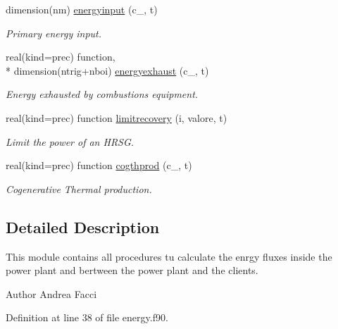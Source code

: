 \begin{DoxyCompactItemize}
dimension(nm) \hyperlink{classenergy_aebd116fdbb931db63a6450c7ba3197df}{energyinput} (c\-\_\-, t)
\begin{DoxyCompactList}\small\item\em Primary energy input. \end{DoxyCompactList}\item 
real(kind=prec) function, \\*
dimension(ntrig+nboi) \hyperlink{classenergy_aa9595768898cb233d53596e9ce19744f}{energyexhaust} (c\-\_\-, t)
\begin{DoxyCompactList}\small\item\em Energy exhausted by combustions equipment. \end{DoxyCompactList}\item 
real(kind=prec) function \hyperlink{classenergy_adee2b0ef7e3ae6a8da4a2357ffa14a28}{limitrecovery} (i, valore, t)
\begin{DoxyCompactList}\small\item\em Limit the power of an H\-R\-S\-G. \end{DoxyCompactList}\item 
real(kind=prec) function \hyperlink{classenergy_a6060381a3418f406c8ca108f9c5a7fd5}{cogthprod} (c\-\_\-, t)
\begin{DoxyCompactList}\small\item\em Cogenerative Thermal production. \end{DoxyCompactList}\end{DoxyCompactItemize}


\subsection{Detailed Description}
This module contains all procedures tu calculate the enrgy fluxes inside the power plant and bertween the power plant and the clients. \begin{DoxyAuthor}{Author}
Andrea Facci 
\end{DoxyAuthor}


Definition at line 38 of file energy.\-f90.



